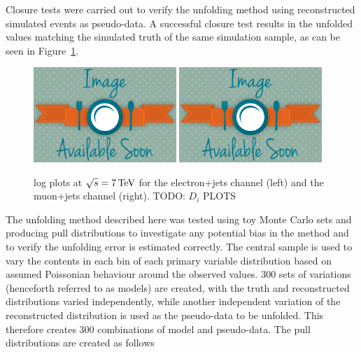 Closure tests were carried out to verify the unfolding method using reconstructed simulated events as
pseudo-data. A successful closure test results in the unfolded values matching the simulated truth of the same
simulation sample, as can be seen in Figure~\ref{fig:unfolding_closure_tests}.

\begin{figure}[hbtp]
    \centering
     \includegraphics[width=0.48\textwidth]{Chapters/04_Analysis/04b_XSections/images/placeholder.png}\hfill
     \includegraphics[width=0.48\textwidth]{Chapters/04_Analysis/04b_XSections/images/placeholder.png}\\
	 \caption{log plots at $\sqrt{s}=7\,\text{Te\hspace{-.08em}V}$ for the electron+jets channel (left) and the muon+jets
	 channel (right). TODO: $D_i$ PLOTS}
     \label{fig:unfolding_closure_tests}
\end{figure}

The unfolding method described here was tested using toy Monte Carlo sets and producing pull distributions to
investigate any potential bias in the method and to verify the unfolding error is estimated correctly. The
central \ttbar \MADGRAPH sample is used to vary the contents in each bin of each primary variable distribution
based on assumed Poissonian behaviour around the observed values. 300 sets of variations (henceforth referred
to as models) are created, with the truth and reconstructed distributions varied independently, while another
independent variation of the reconstructed distribution is used as the pseudo-data to be unfolded. This
therefore creates 300 combinations of model and pseudo-data. The pull distributions are created as
follows

